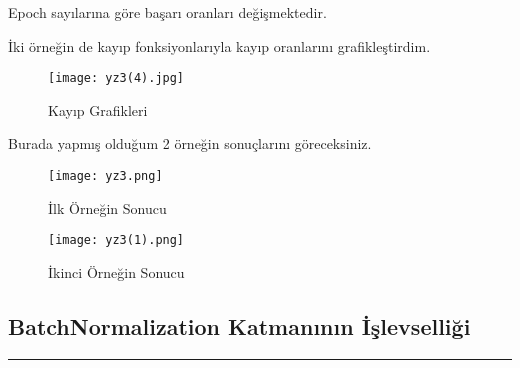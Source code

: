 \documentclass{article}
\begin{document}
\clearpage
\noindent Epoch sayılarına göre başarı oranları değişmektedir.

\renewcommand{\tablename}{Tablo}

\begin{table}[h!]
    \centering
    \label{tab:ModelDoğrulukları}
    \caption{Epoch Sayısının Model Doğruluğu ile Bağlantısı}
\end{table}
\vspace{2cm}

\noindent İki örneğin de kayıp fonksiyonlarıyla kayıp oranlarını grafikleştirdim. \vspace{0.5cm}

\renewcommand{\figurename}{Şekil}

\begin{figure}[htbp]
     \centering
\texttt{[image: yz3(4).jpg]}\centering 
  \caption{Kayıp Grafikleri}
  \label{fig:resim_etiketi}
\end{figure}

\clearpage

\noindent Burada yapmış olduğum 2 örneğin sonuçlarını göreceksiniz. \vspace{0.5 cm}


\begin{figure}[htbp]
     \centering
 \texttt{[image: yz3.png]}\centering 
  \caption{İlk Örneğin Sonucu}
  \label{fig:resim_etiketi}
\end{figure} \vspace{1 cm}


\begin{figure}[htbp]
     \centering
\texttt{[image: yz3(1).png]}\centering 
  \caption{İkinci Örneğin Sonucu}
  \label{fig:resim_etiketi}
\end{figure}


\subsection{BatchNormalization Katmanının İşlevselliği}
\rule{\textwidth}{0.5pt}\\[10pt]
\end{document}
